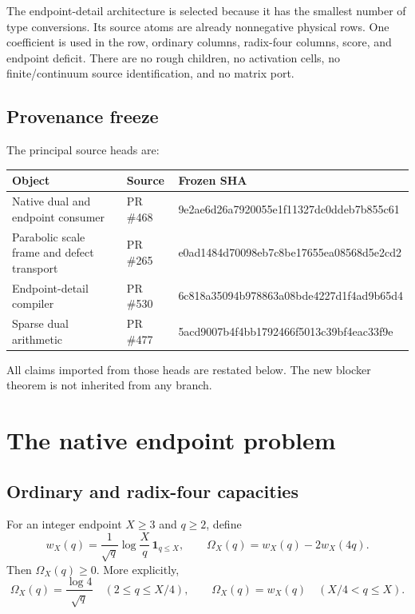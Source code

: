 \documentclass[11pt]{article}
\newcommand{\Om}{\Omega}
\newcommand{\one}{\mathbf 1}
\begin{document}
The endpoint-detail architecture is selected because it has the smallest number of type conversions. Its source atoms are already nonnegative physical rows. One coefficient is used in the row, ordinary columns, radix-four columns, score, and endpoint deficit. There are no rough children, no activation cells, no finite/continuum source identification, and no matrix port.

\subsection{Provenance freeze}

The principal source heads are:
\begin{center}
\small
\begin{tabularx}{\textwidth}{p{}p{}X}
\toprule
Object & Source & Frozen SHA\\
\midrule
Native dual and endpoint consumer & PR \#468 & {\scriptsize\ttfamily 9e2ae6d26a7920055e1f11327dc0ddeb7b855c61}\\
Parabolic scale frame and defect transport & PR \#265 & {\scriptsize\ttfamily e0ad1484d70098eb7c8be17655ea08568d5e2cd2}\\
Endpoint-detail compiler & PR \#530 & {\scriptsize\ttfamily 6c818a35094b978863a08bde4227d1f4ad9b65d4}\\
Sparse dual arithmetic & PR \#477 & {\scriptsize\ttfamily 5acd9007b4f4bb1792466f5013c39bf4eac33f9e}\\
\bottomrule
\end{tabularx}
\end{center}
All claims imported from those heads are restated below. The new blocker theorem is not inherited from any branch.

\section{The native endpoint problem}

\subsection{Ordinary and radix-four capacities}

For an integer endpoint $X\ge3$ and $q\ge2$, define
\begin{equation}
 w_X(q)=\frac{1}{\sqrt q}\log\frac{X}{q}\,\one_{q\le X},
 \qquad
 \Om_X(q)=w_X(q)-2w_X(4q).
 \label{eq:native-target}
\end{equation}
Then $\Om_X(q)\ge0$. More explicitly,
\begin{equation}
 \Om_X(q)=\frac{\log4}{\sqrt q}\quad(2\le q\le X/4),
 \qquad
 \Om_X(q)=w_X(q)\quad(X/4<q\le X).
 \label{eq:omega-pieces}
\end{equation}
\end{document}
